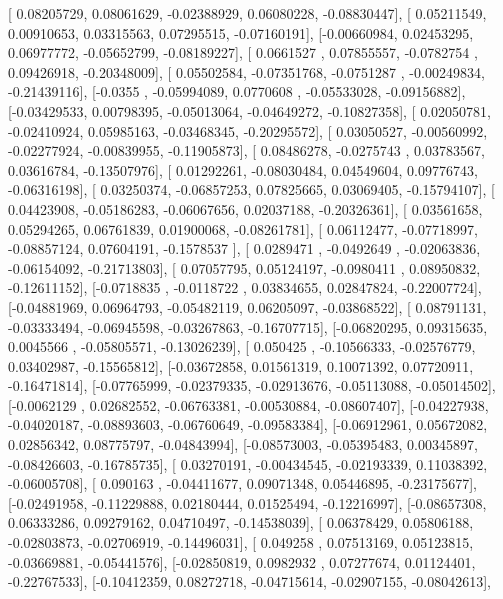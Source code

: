 \documentclass{article}
\begin{document}
       [ 0.08205729,  0.08061629, -0.02388929,  0.06080228, -0.08830447],
       [ 0.05211549,  0.00910653,  0.03315563,  0.07295515, -0.07160191],
       [-0.00660984,  0.02453295,  0.06977772, -0.05652799, -0.08189227],
       [ 0.0661527 ,  0.07855557, -0.0782754 ,  0.09426918, -0.20348009],
       [ 0.05502584, -0.07351768, -0.0751287 , -0.00249834, -0.21439116],
       [-0.0355    , -0.05994089,  0.0770608 , -0.05533028, -0.09156882],
       [-0.03429533,  0.00798395, -0.05013064, -0.04649272, -0.10827358],
       [ 0.02050781, -0.02410924,  0.05985163, -0.03468345, -0.20295572],
       [ 0.03050527, -0.00560992, -0.02277924, -0.00839955, -0.11905873],
       [ 0.08486278, -0.0275743 ,  0.03783567,  0.03616784, -0.13507976],
       [ 0.01292261, -0.08030484,  0.04549604,  0.09776743, -0.06316198],
       [ 0.03250374, -0.06857253,  0.07825665,  0.03069405, -0.15794107],
       [ 0.04423908, -0.05186283, -0.06067656,  0.02037188, -0.20326361],
       [ 0.03561658,  0.05294265,  0.06761839,  0.01900068, -0.08261781],
       [ 0.06112477, -0.07718997, -0.08857124,  0.07604191, -0.1578537 ],
       [ 0.0289471 , -0.0492649 , -0.02063836, -0.06154092, -0.21713803],
       [ 0.07057795,  0.05124197, -0.0980411 ,  0.08950832, -0.12611152],
       [-0.0718835 , -0.0118722 ,  0.03834655,  0.02847824, -0.22007724],
       [-0.04881969,  0.06964793, -0.05482119,  0.06205097, -0.03868522],
       [ 0.08791131, -0.03333494, -0.06945598, -0.03267863, -0.16707715],
       [-0.06820295,  0.09315635,  0.0045566 , -0.05805571, -0.13026239],
       [ 0.050425  , -0.10566333, -0.02576779,  0.03402987, -0.15565812],
       [-0.03672858,  0.01561319,  0.10071392,  0.07720911, -0.16471814],
       [-0.07765999, -0.02379335, -0.02913676, -0.05113088, -0.05014502],
       [-0.0062129 ,  0.02682552, -0.06763381, -0.00530884, -0.08607407],
       [-0.04227938, -0.04020187, -0.08893603, -0.06760649, -0.09583384],
       [-0.06912961,  0.05672082,  0.02856342,  0.08775797, -0.04843994],
       [-0.08573003, -0.05395483,  0.00345897, -0.08426603, -0.16785735],
       [ 0.03270191, -0.00434545, -0.02193339,  0.11038392, -0.06005708],
       [ 0.090163  , -0.04411677,  0.09071348,  0.05446895, -0.23175677],
       [-0.02491958, -0.11229888,  0.02180444,  0.01525494, -0.12216997],
       [-0.08657308,  0.06333286,  0.09279162,  0.04710497, -0.14538039],
       [ 0.06378429,  0.05806188, -0.02803873, -0.02706919, -0.14496031],
       [ 0.049258  ,  0.07513169,  0.05123815, -0.03669881, -0.05441576],
       [-0.02850819,  0.0982932 ,  0.07277674,  0.01124401, -0.22767533],
       [-0.10412359,  0.08272718, -0.04715614, -0.02907155, -0.08042613],
\end{document}
